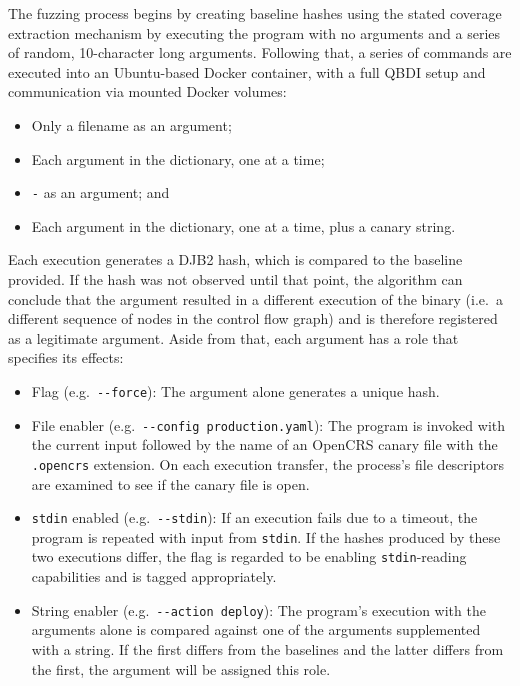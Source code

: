 \documentclass[../main.tex]{subfiles}
\begin{document}
The fuzzing process begins by creating baseline hashes using the
stated coverage extraction mechanism by executing the program with no
arguments and a series of random, 10-character long arguments. Following
that, a series of commands are executed into an Ubuntu-based Docker
container, with a full QBDI setup and communication via mounted Docker
volumes:

\begin{itemize}
\tightlist
\item
  Only a filename as an argument;
\item
  Each argument in the dictionary, one at a time;
\item
  \texttt{-} as an argument; and
\item
  Each argument in the dictionary, one at a time, plus a canary string.
\end{itemize}

Each execution generates a DJB2 hash, which is compared to the baseline
provided. If the hash was not observed until that point, the algorithm
can conclude that the argument resulted in a different execution of the
binary (i.e.~a different sequence of nodes in the control flow graph)
and is therefore registered as a legitimate argument. Aside from that,
each argument has a role that specifies its effects:

\begin{itemize}
\tightlist
\item
  Flag (e.g.~\texttt{-\/-force}): The argument alone generates a unique
  hash.
\item
  File enabler (e.g.~\texttt{-\/-config\ production.yaml}): The program
  is invoked with the current input followed by the name of an OpenCRS
  canary file with the \texttt{.opencrs} extension. On each execution
  transfer, the process's file descriptors are examined to see if the
  canary file is open.
\item
  \texttt{stdin} enabled (e.g.~\texttt{-\/-stdin}): If an execution
  fails due to a timeout, the program is repeated with input from
  \texttt{stdin}. If the hashes produced by these two executions differ,
  the flag is regarded to be enabling \texttt{stdin}-reading
  capabilities and is tagged appropriately.
\item
  String enabler (e.g.~\texttt{-\/-action\ deploy}): The program's
  execution with the arguments alone is compared against one of the
  arguments supplemented with a string. If the first differs from the
  baselines and the latter differs from the first, the argument will be
  assigned this role.
\end{itemize}
\end{document}
